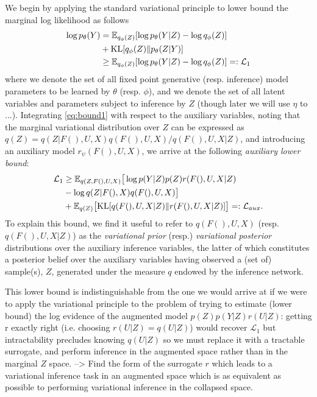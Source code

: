 \documentclass{article}
\begin{document}
We begin by applying the standard variational principle to lower bound the marginal log likelihood as follows
%
\begin{align}
  \log p_\theta(Y) &= \mathbb{E}_{q_\phi(Z)}[\log p_\theta(Y|Z) - \log q_\phi(Z)]\notag\\
  &+ \text{KL}[q_\phi(Z)\Vert p_\theta(Z|Y)]\label{eq:var_principle}\\
  &\geq \mathbb{E}_{q_\phi(Z)}[\log p_\theta(Y|Z) - \log q_\phi(Z)] =: \mathcal{L}_1\label{eq:bound1}
\end{align}
 where we denote the set of all fixed point generative (resp. inference) model parameters to be learned by $\theta$ (resp. $\phi$), and we denote the set of all latent variables and parameters subject to inference by $Z$ (though later we will use $\eta$ to ...).
 Integrating \ref{eq:bound1} with respect to the auxiliary variables, noting that the marginal variational distribution over $Z$ can be expressed as $q(Z) = q(Z|F(),U,X)q(F(),U,X)/q(F(),U,X|Z)$, and introducing an auxiliary model $r_\psi(F(),U,X)$, we arrive at the following \emph{auxiliary lower bound}:
 \begin{align}
  \mathcal{L}_1 &\geq \mathbb{E}_{q(Z,F(),U,X)}\big[ \log p(Y|Z)p(Z)r(F(),U,X|Z)\notag\\
   &- \log q(Z|F(),X)q(F(),U,X) \big]\label{eq:lowerlower}\\
    &+ \mathbb{E}_{q(Z)}\big[ \text{KL}[q(F(),U,X|Z)\Vert r(F(),U,X|Z)] \big] =: \mathcal{L}_{aux}.\label{eq:L_aux}
 \end{align}
%
To explain this bound, we find it useful to refer to $q(F(),U,X)$ (resp. $q(F(),U,X|Z)$) as the \emph{variational prior} (resp.) \emph{variational posterior} distributions over the auxiliary inference variables, the latter of which constitutes a posterior belief over the auxiliary variables having observed a (set of) sample(s), $Z$, generated under the measure $q$ endowed by the inference network.


This lower bound is indistinguishable from the one we would arrive at if we were to apply the variational principle to the problem of trying to estimate (lower bound) the log evidence of the augmented model $p(Z)p(Y|Z)r(U|Z)$: getting r exactly right (i.e. choosing $r(U|Z)=q(U|Z)$) would recover $\mathcal{L}_1$ but intractability precludes knowing $q(U|Z)$ so we must replace it with a tractable surrogate, and perform inference in the augmented space rather than in the marginal $Z$ space. --> Find the form of the surrogate $r$ which leads to a variational inference task in an augmented space which is as equivalent as possible to performing variational inference in the collapsed space.
\end{document}
